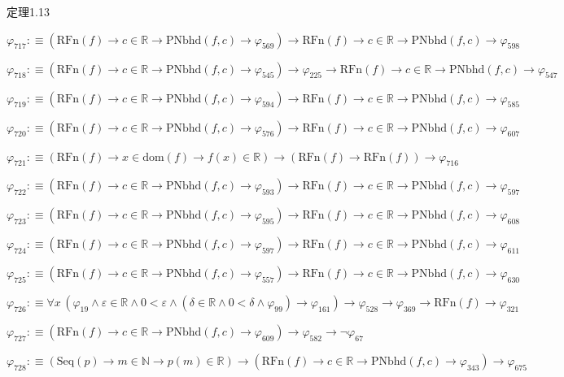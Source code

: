\begin{fullproof}{定理1.13}
\begin{abbrevlist}
\item $\varphi_{717} :\equiv (\mathrm{RFn}(f) \to c \in \mathbb{R} \to \mathrm{PNbhd}(f,c) \to \varphi_{569}) \to \mathrm{RFn}(f) \to c \in \mathbb{R} \to \mathrm{PNbhd}(f,c) \to \varphi_{598}$
\item $\varphi_{718} :\equiv (\mathrm{RFn}(f) \to c \in \mathbb{R} \to \mathrm{PNbhd}(f,c) \to \varphi_{545}) \to \varphi_{225} \to \mathrm{RFn}(f) \to c \in \mathbb{R} \to \mathrm{PNbhd}(f,c) \to \varphi_{547}$
\item $\varphi_{719} :\equiv (\mathrm{RFn}(f) \to c \in \mathbb{R} \to \mathrm{PNbhd}(f,c) \to \varphi_{594}) \to \mathrm{RFn}(f) \to c \in \mathbb{R} \to \mathrm{PNbhd}(f,c) \to \varphi_{585}$
\item $\varphi_{720} :\equiv (\mathrm{RFn}(f) \to c \in \mathbb{R} \to \mathrm{PNbhd}(f,c) \to \varphi_{576}) \to \mathrm{RFn}(f) \to c \in \mathbb{R} \to \mathrm{PNbhd}(f,c) \to \varphi_{607}$
\item $\varphi_{721} :\equiv (\mathrm{RFn}(f) \to x \in \mathrm{dom}(f) \to f(x) \in \mathbb{R}) \to (\mathrm{RFn}(f) \to \mathrm{RFn}(f)) \to \varphi_{716}$
\item $\varphi_{722} :\equiv (\mathrm{RFn}(f) \to c \in \mathbb{R} \to \mathrm{PNbhd}(f,c) \to \varphi_{593}) \to \mathrm{RFn}(f) \to c \in \mathbb{R} \to \mathrm{PNbhd}(f,c) \to \varphi_{597}$
\item $\varphi_{723} :\equiv (\mathrm{RFn}(f) \to c \in \mathbb{R} \to \mathrm{PNbhd}(f,c) \to \varphi_{595}) \to \mathrm{RFn}(f) \to c \in \mathbb{R} \to \mathrm{PNbhd}(f,c) \to \varphi_{608}$
\item $\varphi_{724} :\equiv (\mathrm{RFn}(f) \to c \in \mathbb{R} \to \mathrm{PNbhd}(f,c) \to \varphi_{597}) \to \mathrm{RFn}(f) \to c \in \mathbb{R} \to \mathrm{PNbhd}(f,c) \to \varphi_{611}$
\item $\varphi_{725} :\equiv (\mathrm{RFn}(f) \to c \in \mathbb{R} \to \mathrm{PNbhd}(f,c) \to \varphi_{557}) \to \mathrm{RFn}(f) \to c \in \mathbb{R} \to \mathrm{PNbhd}(f,c) \to \varphi_{630}$
\item $\varphi_{726} :\equiv \forall x\,(\varphi_{19} \land \varepsilon \in \mathbb{R} \land 0 < \varepsilon \land (\delta \in \mathbb{R} \land 0 < \delta \land \varphi_{99}) \to \varphi_{161}) \to \varphi_{528} \to \varphi_{369} \to \mathrm{RFn}(f) \to \varphi_{321}$
\item $\varphi_{727} :\equiv (\mathrm{RFn}(f) \to c \in \mathbb{R} \to \mathrm{PNbhd}(f,c) \to \varphi_{609}) \to \varphi_{582} \to \neg \varphi_{67}$
\item $\varphi_{728} :\equiv (\mathrm{Seq}(p) \to m \in \mathbb{N} \to p(m) \in \mathbb{R}) \to (\mathrm{RFn}(f) \to c \in \mathbb{R} \to \mathrm{PNbhd}(f,c) \to \varphi_{343}) \to \varphi_{675}$

\end{abbrevlist}
\end{fullproof}
